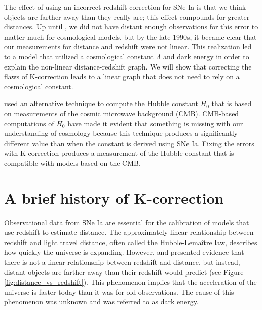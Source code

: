 The effect of using an incorrect redshift correction for SNe Ia is that we think
objects are farther away than they really are; this effect compounds for
greater distances. Up until \citet{riess1998}, we did not have distant enough
observations for this error to matter much for cosmological models, but by the
late 1990s, it became clear that our measurements for distance and redshift
were not linear. This realization led to a model that utilized a cosmological
constant $\Lambda$ and dark energy in order to explain the non-linear
distance-redshift graph. We will show that correcting the flaws of K-correction
leads to a linear graph that does not need to rely on a cosmological constant.

\citet{planck2015} used an alternative technique to compute the Hubble constant
$H_0$ that is based on measurements of the cosmic microwave background (CMB).
CMB-based computations of $H_0$ have made it evident that something is missing
with our understanding of cosmology because this technique produces a
significantly different value than when the constant is derived using SNe Ia.
Fixing the errors with K-correction produces a measurement of the Hubble
constant that is compatible with models based on the CMB.

\section{A brief history of K-correction}

Observational data from SNe Ia are essential for the calibration of models that
use redshift to estimate distance. The approximately linear relationship
between redshift and light travel distance, often called the
Hubble-Lema\^{i}tre law, describes how quickly the universe is expanding.
However, \citet{riess1998} and \citet{perlmutter1999} presented evidence that
there is not a linear relationship between redshift and distance, but instead,
distant objects are farther away than their redshift would predict (see Figure
\ref{fig:distance_vs_redshift}). This phenomenon implies that the
acceleration of the universe is faster today than it was for old observations.
The cause of this phenomenon was unknown and was referred to as dark energy.

